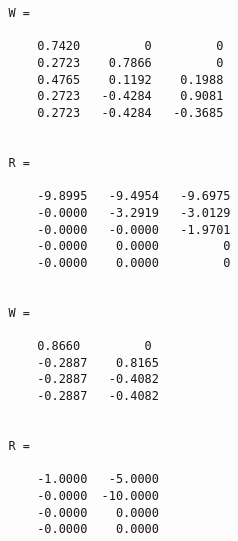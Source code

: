 \documentclass[11pt]{article}
\begin{document}
\begin{enumerate}
\begin{verbatim}
                W =

                    0.7420         0         0
                    0.2723    0.7866         0
                    0.4765    0.1192    0.1988
                    0.2723   -0.4284    0.9081
                    0.2723   -0.4284   -0.3685


                R =

                    -9.8995   -9.4954   -9.6975
                    -0.0000   -3.2919   -3.0129
                    -0.0000   -0.0000   -1.9701
                    -0.0000    0.0000         0
                    -0.0000    0.0000         0


                W =

                    0.8660         0
                    -0.2887    0.8165
                    -0.2887   -0.4082
                    -0.2887   -0.4082


                R =

                    -1.0000   -5.0000
                    -0.0000  -10.0000
                    -0.0000    0.0000
                    -0.0000    0.0000
        \end{verbatim}

\end{enumerate}
\end{document}
